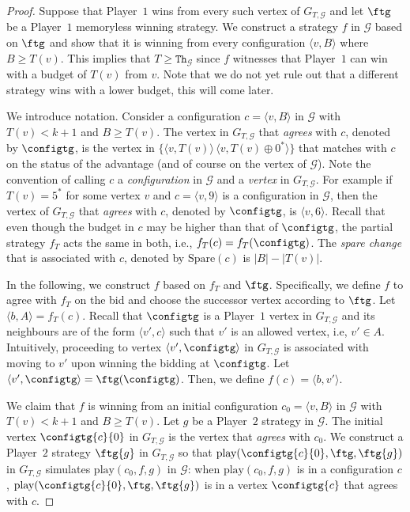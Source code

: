 \documentclass{article}\providecommand{\nequiv}{\not\equiv}\usepackage[a4paper,margin=20mm]{geometry}
\newcommand{\PO}{Player~$1$\xspace}
\newcommand{\PT}{Player~$2$\xspace}
\newcommand{\G}{{\mathcal G}}
\newcommand{\thresh}{\texttt{Th}\xspace}
\newcommand{\play}{\text{play}\xspace}
\newcommand{\Spare}{\text{Spare}\xspace}
\newcommand{\zug}[1]{\langle #1  \rangle}
\newcommand{\succb}[1]{#1 \oplus 0^*\xspace}
\begin{document}
\begin{proof}
	Suppose that \PO wins from every such vertex of \(G_{T, \G}\) and let \(\ftg\) be a \PO memoryless winning strategy. 
	We construct a strategy \(f\) in \(\G\) based on \(\ftg\) and show that it is winning from every configuration \(\zug{v, B}\) where \(B \geq T(v)\). 
	This implies that \(T \geq \thresh_{\G}\) since \(f\) witnesses that \PO can win with a budget of \(T(v)\) from \(v\). Note that we do not yet rule out that a different strategy wins with a lower budget, this will come later. 
	
	We introduce notation. 
	Consider a configuration \(c = \zug{v, B}\) in \(\G\) with $T(v) < k+1$ and \(B \geq T(v)\). 
	The vertex in \(G_{T, \G}\) that \emph{agrees} with \(c\), denoted by \(\configtg\), is the vertex in \(\{\zug{v, T(v)}\, \zug{v, \succb{T(v)}}\}\) that matches with \(c\) on the status of the advantage (and of course on the vertex of \(\G\)). Note the convention of calling $c$ a {\em configuration} in $\G$ and a {\em vertex} in $G_{T,\G}$. 
	For example if \(T(v) = 5^*\) for some vertex \(v\) and \(c = \zug{v, 9}\) is a configuration in \(\G\), then the vertex of \(G_{T, \G}\) that \emph{agrees} with \(c\), denoted by \(\configtg\), is \(\zug{v, 6}\).  
	Recall that even though the budget in \(c\) may be higher than that of \(\configtg\), the partial strategy \(f_T\) acts the same in both, i.e., \(f_T(c) = f_T(\configtg)\). 
	The \emph{spare change} that is associated with \(c\), denoted by \(\Spare(c)\) is \(|B| - |T(v)|\). 
	
	In the following, we construct \(f\) based on \(f_T\) and \(\ftg\). 
	Specifically, we define \(f\) to agree with \(f_T\) on the bid and choose the successor vertex according to \(\ftg\).
	Let \(\zug{b, A} = f_T(c)\).  
	Recall that \(\configtg\) is a \PO vertex in \(G_{T, \G}\) and its neighbours are of the form \(\zug{v', c}\) such that \(v'\) is an allowed vertex, i.e, \(v' \in A\). 
	Intuitively, proceeding to vertex \(\zug{v', \configtg}\) in \(G_{T, \G}\) is associated with moving to \(v'\) upon winning the bidding at \(\configtg\).
	Let \(\zug{v', \configtg} = \ftg(\configtg)\). 
	Then, we define \(f(c) = \zug{b, v'}\). 
	
	We claim that \(f\) is winning from an initial configuration \(c_0 = \zug{v, B}\) in \(\G\) with $T(v) < k+1$ and \(B \geq T(v)\). 
	Let \(g\) be a \PT strategy in \(\G\). 
	The initial vertex \(\configtg{c}{0}\) in \(G_{T, \G}\) is the vertex that \emph{agrees} with \(c_0\).
	We construct a \PT strategy \(\ftg{g}\) in \(G_{T, \G}\) so that \(\play(\configtg{c}{0}, \ftg, \ftg{g})\) in \(G_{T, \G}\) simulates \(\play(c_0, f, g)\) in \(\G\): when \(\play(c_0, f, g)\) is in a configuration \(c\), \(\play(\configtg{c}{0}, \ftg, \ftg{g})\) is in a vertex \(\configtg{c}\) that agrees with \(c\). 
	

\end{proof}
\end{document}
